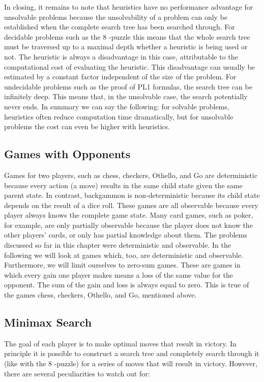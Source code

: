 \documentclass[10pt]{book}
\begin{document}
In closing, it remains to note that heuristics have no performance advantage for unsolvable problems because the unsolvability of a problem can only be established when the complete search tree has been searched through. For decidable problems such as the 8 -puzzle this means that the whole search tree must be traversed up to a maximal depth whether a heuristic is being used or not. The heuristic is always a disadvantage in this case, attributable to the computational cost of evaluating the heuristic. This disadvantage can usually be estimated by a constant factor independent of the size of the problem. For undecidable problems such as the proof of PL1 formulas, the search tree can be infinitely deep. This means that, in the unsolvable case, the search potentially never ends. In summary we can say the following: for solvable problems, heuristics often reduce computation time dramatically, but for unsolvable problems the cost can even be higher with heuristics.

\subsection{Games with Opponents}
Games for two players, such as chess, checkers, Othello, and Go are deterministic because every action (a move) results in the same child state given the same parent state. In contrast, backgammon is non-deterministic because its child state depends on the result of a dice roll. These games are all observable because every player always knows the complete game state. Many card games, such as poker, for example, are only partially observable because the player does not know the other players' cards, or only has partial knowledge about them.
The problems discussed so far in this chapter were deterministic and observable. In the following we will look at games which, too, are deterministic and observable. Furthermore, we will limit ourselves to zero-sum games. These are games in which every gain one player makes means a loss of the same value for the opponent. The sum of the gain and loss is always equal to zero. This is true of the games chess, checkers, Othello, and Go, mentioned above.

\subsection{Minimax Search}
The goal of each player is to make optimal moves that result in victory. In principle it is possible to construct a search tree and completely search through it (like with the 8 -puzzle) for a series of moves that will result in victory. However, there are several peculiarities to watch out for:
\end{document}
